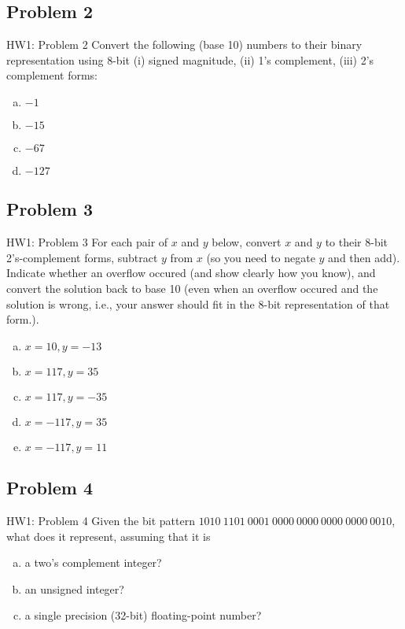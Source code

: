 \documentclass{../slides}
\begin{document}
\subsection{Problem 2}
\begin{frame}{HW1: Problem 2}
    Convert the following (base 10) numbers to their binary representation using 8-bit (i) signed magnitude, (ii) 1’s complement, (iii) 2’s complement forms:
    \begin{enumerate}[(a)]
        \item $-1$
        \item $-15$
        \item $-67$
        \item $-127$
    \end{enumerate}
\end{frame}

\subsection{Problem 3}
\begin{frame}{HW1: Problem 3}
    For each pair of $x$ and $y$ below, convert $x$ and $y$ to their 8-bit 2’s-complement forms, subtract $y$ from $x$ (so you need to negate $y$ and then add). Indicate whether an overflow occured (and show clearly how you know), and convert the solution back to base 10 (even when an overflow occured and the solution is wrong, i.e., your answer should fit in the 8-bit representation of that form.).
    \begin{enumerate}[(a)]
        \item $x = 10, y = -13$
        \item $x = 117, y = 35$
        \item $x = 117, y = -35$
        \item $x = -117, y = 35$
        \item $x = -117, y = 11$
    \end{enumerate}
\end{frame}

\subsection{Problem 4}
\begin{frame}{HW1: Problem 4}
    Given the bit pattern $1010\ 1101\ 0001\ 0000\ 0000\ 0000\ 0000\ 0010$, what does it represent, assuming that it is
    \begin{enumerate}[(a)]
        \item a two's complement integer?
        \item an unsigned integer?
        \item a single precision (32-bit) floating-point number?
    \end{enumerate}
\end{frame}
\end{document}
